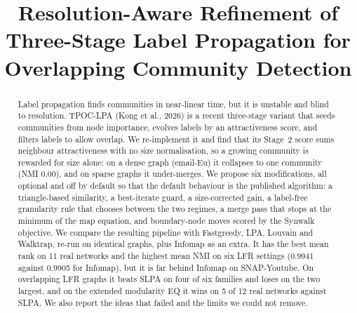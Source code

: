 \documentclass[conference]{IEEEtran}
\begin{document}
\title{Resolution-Aware Refinement of Three-Stage Label Propagation for Overlapping Community Detection}

\author{
\and
{}
\and
{}
}

\maketitle

\begin{abstract}
Label propagation finds communities in near-linear time, but it is unstable and blind to resolution. TPOC-LPA (Kong et al., 2026) is a recent three-stage variant that seeds communities from node importance, evolves labels by an attractiveness score, and filters labels to allow overlap. We re-implement it and find that its Stage~2 score sums neighbour attractiveness with no size normalisation, so a growing community is rewarded for size alone: on a dense graph (email-Eu) it collapses to one community (NMI 0.00), and on sparse graphs it under-merges. We propose six modifications, all optional and off by default so that the default behaviour is the published algorithm: a triangle-based similarity, a best-iterate guard, a size-corrected gain, a label-free granularity rule that chooses between the two regimes, a merge pass that stops at the minimum of the map equation, and boundary-node moves scored by the Synwalk objective. We compare the resulting pipeline with Fastgreedy, LPA, Louvain and Walktrap, re-run on identical graphs, plus Infomap as an extra. It has the best mean rank on 11 real networks and the highest mean NMI on six LFR settings (0.9941 against 0.9905 for Infomap), but it is far behind Infomap on SNAP-Youtube. On overlapping LFR graphs it beats SLPA on four of six families and loses on the two largest, and on the extended modularity EQ it wins on 5 of 12 real networks against SLPA. We also report the ideas that failed and the limits we could not remove.
\end{abstract}
\end{document}
